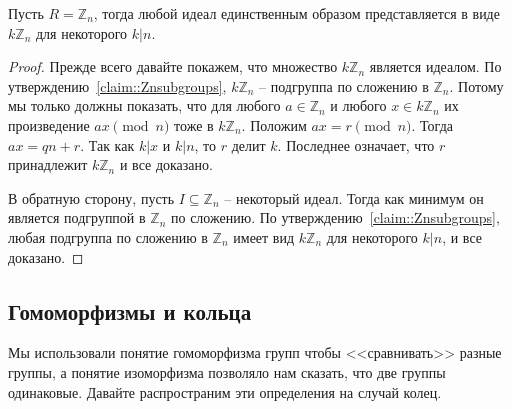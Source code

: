 \begin{claim}
\label{claim::ZnIdeals}
Пусть $R = \mathbb Z_n$, тогда любой идеал единственным образом представляется в виде $k\mathbb Z_n$ для некоторого $k|n$.
\end{claim}
\begin{proof}
Прежде всего давайте покажем, что множество $k \mathbb Z_n$ является идеалом.
По утверждению~\ref{claim::Znsubgroups}, $k \mathbb Z_n$ -- подгруппа по сложению в $\mathbb Z_n$.
Потому мы только должны показать, что для любого $a\in \mathbb Z_n$ и любого $x\in k \mathbb Z_n$ их произведение $a x \pmod n$ тоже в $k \mathbb Z_n$.
Положим $a x = r \pmod n$.
Тогда $a x = q n + r$.
Так как $k|x$ и $k | n$, то $r$ делит $k$.
Последнее означает, что $r$ принадлежит $k \mathbb Z_n$ и все доказано.

В обратную сторону, пусть $I\subseteq \mathbb Z_n$ -- некоторый идеал.
Тогда как минимум он является подгруппой в $\mathbb Z_n$ по сложению.
По утверждению~\ref{claim::Znsubgroups}, любая подгруппа по сложению в $\mathbb Z_n$ имеет вид $k \mathbb Z_n$ для некоторого $k | n$, и все доказано.
\end{proof}

\subsection{Гомоморфизмы и кольца}

Мы использовали понятие гомоморфизма групп чтобы <<сравнивать>> разные группы, а понятие изоморфизма позволяло нам сказать, что две группы одинаковые.
Давайте распространим эти определения на случай колец.

